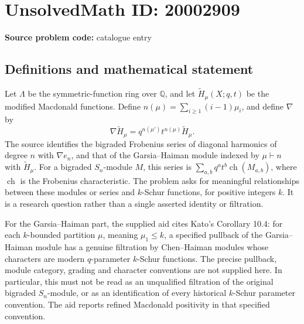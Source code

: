 \documentclass[11pt]{article}
\newcommand{\Q}{\mathbb{Q}}
\begin{document}
\section*{UnsolvedMath ID: 20002909}
\textbf{Source problem code:} catalogue entry
\subsection{Definitions and mathematical statement}
Let \(\Lambda\) be the symmetric-function ring over \(\Q\), and let \(\widetilde H_\mu(X;q,t)\) be the modified Macdonald functions. Define \(n(\mu)=\sum_{i\ge1}(i-1)\mu_i\), and define \(\nabla\) by
\[
\nabla\widetilde H_\mu=q^{n(\mu')}t^{n(\mu)}\widetilde H_\mu.
\]
The source identifies the bigraded Frobenius series of diagonal harmonics of degree \(n\) with \(\nabla e_n\), and that of the Garsia--Haiman module indexed by \(\mu\vdash n\) with \(\widetilde H_\mu\). For a bigraded \(S_n\)-module \(M\), this series is \(\sum_{a,b}q^at^b\operatorname{ch}(M_{a,b})\), where \(\operatorname{ch}\) is the Frobenius characteristic. The problem asks for meaningful relationships between these modules or series and \(k\)-Schur functions, for positive integers \(k\). It is a research question rather than a single asserted identity or filtration.

For the Garsia--Haiman part, the supplied aid cites Kato's Corollary 10.4: for each \(k\)-bounded partition \(\mu\), meaning \(\mu_1\le k\), a specified pullback of the Garsia--Haiman module has a genuine filtration by Chen--Haiman modules whose characters are modern \(q\)-parameter \(k\)-Schur functions. The precise pullback, module category, grading and character conventions are not supplied here. In particular, this must not be read as an unqualified filtration of the original bigraded \(S_n\)-module, or as an identification of every historical \(k\)-Schur parameter convention. The aid reports refined Macdonald positivity in that specified convention.
\end{document}

